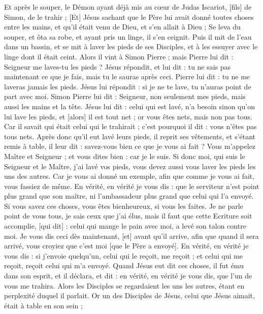 \begin{multicols}{2}
Et après le souper, le Démon ayant déjà mis au cœur de Judas Iscariot, [fils] de Simon, de le trahir ;
[Et] Jésus sachant que le Père lui avait donné toutes choses entre les mains, et qu'il était venu de Dieu, et s'en allait à Dieu ;
Se leva du souper, et ôta sa robe, et ayant pris un linge, il s'en ceignit.
Puis il mit de l'eau dans un bassin, et se mit à laver les pieds de ses Disciples, et à les essuyer avec le linge dont il était ceint.
Alors il vint à Simon Pierre ; mais Pierre lui dit : Seigneur me laves-tu les pieds ?
Jésus répondit, et lui dit : tu ne sais pas maintenant ce que je fais, mais tu le sauras après ceci.
Pierre lui dit : tu ne me laveras jamais les pieds. Jésus lui répondit : si je ne te lave, tu n'auras point de part avec moi.
Simon Pierre lui dit : Seigneur, non seulement mes pieds, mais aussi les mains et la tête.
Jésus lui dit : celui qui est lavé, n'a besoin sinon qu'on lui lave les pieds, et [alors] il est tout net ; or vous êtes nets, mais non pas tous.
Car il savait qui était celui qui le trahirait ; c'est pourquoi il dit : vous n'êtes pas tous nets.
Après donc qu'il eut lavé leurs pieds, il reprit ses vêtements, et s'étant remis à table, il leur dit : savez-vous bien ce que je vous ai fait ?
Vous m'appelez Maître et Seigneur ; et vous dites bien : car je le suis.
Si donc moi, qui suis le Seigneur et le Maître, j'ai lavé vos pieds, vous devez aussi vous laver les pieds les uns des autres.
Car je vous ai donné un exemple, afin que comme je vous ai fait, vous fassiez de même.
En vérité, en vérité je vous dis : que le serviteur n'est point plus grand que son maître, ni l'ambassadeur plus grand que celui qui l'a envoyé.
Si vous savez ces choses, vous êtes bienheureux, si vous les faites.
Je ne parle point de vous tous, je sais ceux que j'ai élus, mais il faut que cette Ecriture soit accomplie, [qui dit] : celui qui mange le pain avec moi, a levé son talon contre moi.
Je vous dis ceci dès maintenant, [et] avant qu'il arrive, afin que quand il sera arrivé, vous croyiez que c'est moi [que le Père a envoyé].
En vérité, en vérité je vous dis : si j'envoie quelqu'un, celui qui le reçoit, me reçoit ; et celui qui me reçoit, reçoit celui qui m'a envoyé.
Quand Jésus eut dit ces choses, il fut ému dans son esprit, et il déclara, et dit : en vérité, en vérité je vous dis, que l'un de vous me trahira.
Alors les Disciples se regardaient les uns les autres, étant en perplexité duquel il parlait.
Or un des Disciples de Jésus, celui que Jésus aimait, était à table en son sein ;

\end{multicols}

